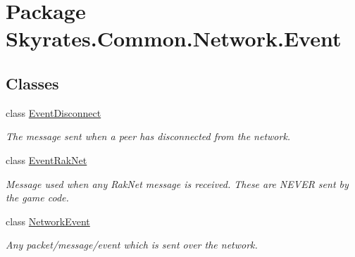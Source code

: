 \hypertarget{namespace_skyrates_1_1_common_1_1_network_1_1_event}{\section{Package Skyrates.\-Common.\-Network.\-Event}
\label{namespace_skyrates_1_1_common_1_1_network_1_1_event}
}
\subsection*{Classes}
\begin{DoxyCompactItemize}
\item 
class \hyperlink{class_skyrates_1_1_common_1_1_network_1_1_event_1_1_event_disconnect}{Event\-Disconnect}
\begin{DoxyCompactList}\small\item\em The message sent when a peer has disconnected from the network. \end{DoxyCompactList}\item 
class \hyperlink{class_skyrates_1_1_common_1_1_network_1_1_event_1_1_event_rak_net}{Event\-Rak\-Net}
\begin{DoxyCompactList}\small\item\em Message used when any Rak\-Net message is received. These are N\-E\-V\-E\-R sent by the game code. \end{DoxyCompactList}\item 
class \hyperlink{class_skyrates_1_1_common_1_1_network_1_1_event_1_1_network_event}{Network\-Event}
\begin{DoxyCompactList}\small\item\em Any packet/message/event which is sent over the network. \end{DoxyCompactList}\end{DoxyCompactItemize}
